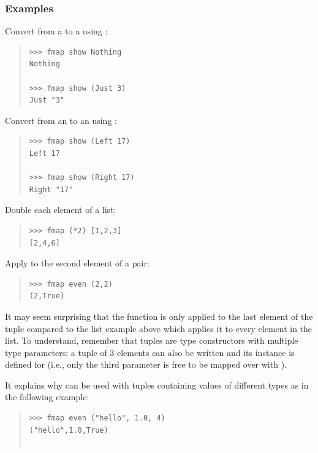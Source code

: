 \begin{haddockdesc}
{\begin{haddockdesc}
{\subsubsection*{\textbf{Examples}}
Convert from a  to a 
 using :\par
\begin{quote}
{\haddockverb\begin{verbatim}
>>> fmap show Nothing
Nothing

>>> fmap show (Just 3)
Just "3"

\end{verbatim}}
\end{quote}
Convert from an  to an
  using :\par
\begin{quote}
{\haddockverb\begin{verbatim}
>>> fmap show (Left 17)
Left 17

>>> fmap show (Right 17)
Right "17"

\end{verbatim}}
\end{quote}
Double each element of a list:\par
\begin{quote}
{\haddockverb\begin{verbatim}
>>> fmap (*2) [1,2,3]
[2,4,6]

\end{verbatim}}
\end{quote}
Apply  to the second element of a pair:\par
\begin{quote}
{\haddockverb\begin{verbatim}
>>> fmap even (2,2)
(2,True)

\end{verbatim}}
\end{quote}
It may seem surprising that the function is only applied to the last element of the tuple
 compared to the list example above which applies it to every element in the list.
 To understand, remember that tuples are type constructors with multiple type parameters:
 a tuple of 3 elements  can also be written  and its  instance
 is defined for  (i.e., only the third parameter is free to be mapped over
 with ).\par
It explains why  can be used with tuples containing values of different types as in the
 following example:\par
\begin{quote}
{\haddockverb\begin{verbatim}
>>> fmap even ("hello", 1.0, 4)
("hello",1.0,True)


\end{verbatim}}
\end{quote}}
\end{haddockdesc}}
\end{haddockdesc}
